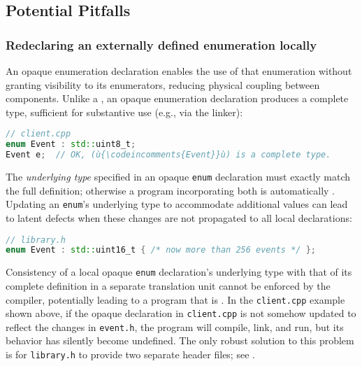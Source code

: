 \subsection[Potential Pitfalls]{Potential Pitfalls}\label{potential-pitfalls-opaqueenum}

\subsubsection[Redeclaring an externally defined enumeration locally]{Redeclaring an externally defined enumeration locally}\label{redeclaring-an-externally-defined-enumeration-locally}

An opaque enumeration declaration enables the use of that
enumeration without granting visibility to its enumerators, reducing
physical coupling between components. Unlike a , an opaque enumeration declaration produces a complete
type, sufficient for substantive use (e.g., via the linker):

\begin{lstlisting}[language=C++]
// client.cpp
enum Event : std::uint8_t;
Event e;  // OK, (ù{\codeincomments{Event}}ù) is a complete type.
\end{lstlisting}

\noindent The \emph{underlying type} specified in an opaque \lstinline!enum!
declaration must exactly match the full definition; otherwise a program
incorporating both is automatically . Updating an
\lstinline!enum!'s underlying type to accommodate additional values can
lead to latent defects when these changes are not propagated to all
local declarations:

\begin{lstlisting}[language=C++]
// library.h
enum Event : std::uint16_t { /* now more than 256 events */ };
\end{lstlisting}

\noindent Consistency of a local opaque \lstinline!enum! declaration's underlying
type with that of its complete definition in a separate translation unit
cannot be enforced by the compiler, potentially leading to a program
that is . In the \lstinline!client.cpp! example shown above, if the opaque
declaration in \lstinline!client.cpp! is not somehow updated to reflect the
changes in \lstinline!event.h!, the program will compile, link, and run,
but its behavior has silently become undefined. The only robust solution
to this problem is for \lstinline!library.h! to provide two separate header
files; see .

